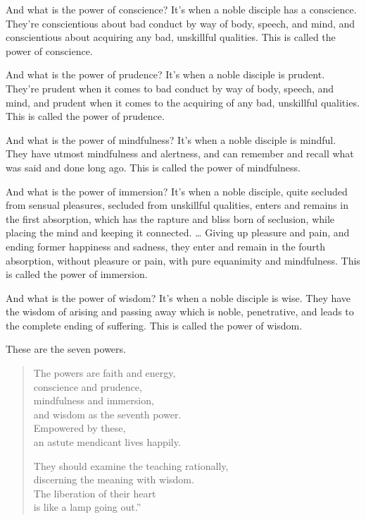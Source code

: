 \documentclass[12pt,openany]{book}%
\begin{document}
And what is the power of conscience? It’s when a noble disciple has a conscience. They’re conscientious about bad conduct by way of body, speech, and mind, and conscientious about acquiring any bad, unskillful qualities. This is called the power of conscience. 

And what is the power of prudence? It’s when a noble disciple is prudent. They’re prudent when it comes to bad conduct by way of body, speech, and mind, and prudent when it comes to the acquiring of any bad, unskillful qualities. This is called the power of prudence. 

And what is the power of mindfulness? It’s when a noble disciple is mindful. They have utmost mindfulness and alertness, and can remember and recall what was said and done long ago. This is called the power of mindfulness. 

And what is the power of immersion? It’s when a noble disciple, quite secluded from sensual pleasures, secluded from unskillful qualities, enters and remains in the first absorption, which has the rapture and bliss born of seclusion, while placing the mind and keeping it connected. … Giving up pleasure and pain, and ending former happiness and sadness, they enter and remain in the fourth absorption, without pleasure or pain, with pure equanimity and mindfulness. This is called the power of immersion. 

And what is the power of wisdom? It’s when a noble disciple is wise. They have the wisdom of arising and passing away which is noble, penetrative, and leads to the complete ending of suffering. This is called the power of wisdom. 

These are the seven powers. 

\begin{verse}%
The powers are faith and energy, \\
conscience and prudence, \\
mindfulness and immersion, \\
and wisdom as the seventh power. \\
Empowered by these, \\
an astute mendicant lives happily. 

They should examine the teaching rationally, \\
discerning the meaning with wisdom. \\
The liberation of their heart \\
is like a lamp going out.” 

%
\end{verse}
\end{document}
